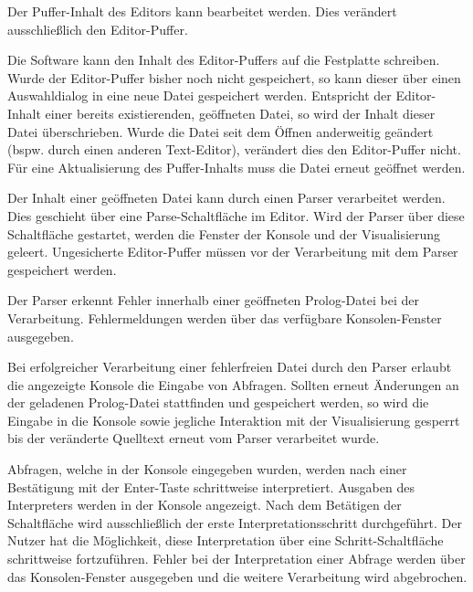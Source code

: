 \documentclass[parskip=full,11pt,twoside]{scrartcl}
\begin{document}

Der Puffer-Inhalt des Editors kann bearbeitet werden. Dies verändert ausschließlich den Editor-Puffer.


Die Software kann den Inhalt des Editor-Puffers auf die Festplatte schreiben. Wurde der Editor-Puffer bisher noch nicht gespeichert, so kann dieser über einen Auswahldialog in eine neue Datei gespeichert werden. Entspricht der Editor-Inhalt einer bereits existierenden, geöffneten Datei, so wird der Inhalt dieser Datei überschrieben. Wurde die Datei seit dem Öffnen anderweitig geändert (bspw. durch einen anderen Text-Editor), verändert dies den Editor-Puffer nicht. Für eine Aktualisierung des Puffer-Inhalts muss die Datei erneut geöffnet werden.


Der Inhalt einer geöffneten Datei kann durch einen Parser verarbeitet werden. Dies geschieht über eine Parse-Schaltfläche im Editor. Wird der Parser über diese Schaltfläche gestartet, werden die Fenster der Konsole und der Visualisierung geleert. Ungesicherte Editor-Puffer müssen vor der Verarbeitung mit dem Parser gespeichert werden.


Der Parser erkennt Fehler innerhalb einer geöffneten Prolog-Datei bei der Verarbeitung. Fehlermeldungen werden über das verfügbare Konsolen-Fenster ausgegeben.


Bei erfolgreicher Verarbeitung einer fehlerfreien Datei durch den Parser erlaubt die angezeigte Konsole die Eingabe von Abfragen. Sollten erneut Änderungen an der geladenen Prolog-Datei stattfinden und gespeichert werden, so wird die Eingabe in die Konsole sowie jegliche Interaktion mit der Visualisierung gesperrt bis der veränderte Quelltext erneut vom Parser verarbeitet wurde.


Abfragen, welche in der Konsole eingegeben wurden, werden nach einer Bestätigung mit der Enter-Taste schrittweise interpretiert. Ausgaben des Interpreters werden in der Konsole angezeigt. Nach dem Betätigen der Schaltfläche wird ausschließlich der erste Interpretationsschritt durchgeführt. Der Nutzer hat die Möglichkeit, diese Interpretation über eine Schritt-Schaltfläche schrittweise fortzuführen. Fehler bei der Interpretation einer Abfrage werden über das Konsolen-Fenster ausgegeben und die weitere Verarbeitung wird abgebrochen.
\end{document}

